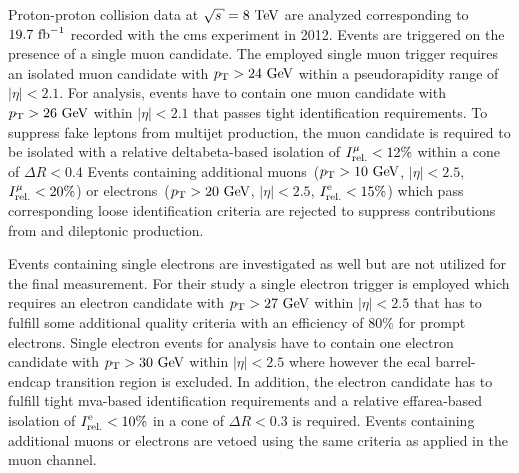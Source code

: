 Proton-proton collision data at $\sqrt{s}=8~\TeV$ are analyzed corresponding to $19.7~\invfb$ recorded with the \gls{cms} experiment in 2012. Events are triggered on the presence of a single muon candidate. The employed single muon trigger requires an isolated muon candidate with $p_\textrm{T}>24~\textrm{GeV}$ within a pseudorapidity range of $|\eta|<2.1$.  For analysis, events have to contain one muon candidate with $p_\textrm{T}>26~\textrm{GeV}$ within $|\eta|<2.1$ that passes tight identification requirements. To suppress fake leptons from multijet production, the muon candidate is required to be isolated with a relative \gls{deltabeta}-based isolation of $\muiso<12\%$ within a cone of $\Delta R<0.4$  Events containing additional muons~($p_\textrm{T}>10~\textrm{GeV}$, $|\eta|<2.5$, $\muiso<20\%$) or electrons~($p_\textrm{T}>20~\textrm{GeV}$, $|\eta|<2.5$, $\eiso<15\%$) which pass corresponding loose identification criteria are rejected to suppress contributions from \zjets and dileptonic \ttbar production. 

Events containing single electrons are investigated as well but are not utilized for the final measurement. For their study a single electron trigger is employed which requires an electron candidate with $p_\textrm{T}>27~\textrm{GeV}$ within $|\eta|<2.5$ that has to fulfill some additional quality criteria with an efficiency of 80\% for prompt electrons. Single electron events for analysis have to contain one electron candidate with $p_\textrm{T}>30~\textrm{GeV}$ within $|\eta|<2.5$ where however the \gls{ecal} barrel-endcap transition region is excluded. In addition, the electron candidate has to fulfill tight \gls{mva}-based identification requirements and a relative \gls{effarea}-based isolation of $\eiso<10\%$ in a cone of $\Delta R <0.3$ is required. Events containing additional muons or electrons are vetoed using the same criteria as applied in the muon channel.

